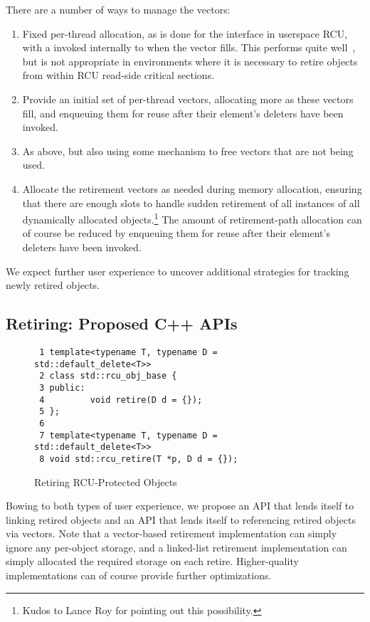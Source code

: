\documentclass[letterpaper,10pt]{article}
\begin{document}
There are a number of ways to manage the vectors:

\begin{enumerate}
\item	Fixed per-thread allocation, as is done for the 
	interface in userspace RCU, with a 
	invoked internally to  when the vector fills.
	This performs quite well~\cite{MathieuDesnoyers2012URCU}, but
	is not appropriate in environments where it is necessary to
	retire objects from within RCU read-side critical sections.
\item	Provide an initial set of per-thread vectors, allocating more
	as these vectors fill, and enqueuing them for reuse after
	their element's deleters have been invoked.
\item	As above, but also using some mechanism to free vectors that
	are not being used.
\item	Allocate the retirement vectors as needed during memory allocation,
	ensuring that there are enough slots to handle sudden
	retirement of all instances of all dynamically allocated
	objects.\footnote{
		Kudos to Lance Roy for pointing out this possibility.}
	The amount of retirement-path allocation can of course be reduced
	by enqueuing them for reuse after their element's deleters have
	been invoked.
\end{enumerate}

We expect further user experience to uncover additional strategies for
tracking newly retired objects.

\subsection{Retiring: Proposed C++ APIs}
\label{sec:Retiring: Proposed C++ APIs}

\begin{figure}[tbp]
{ \scriptsize
\begin{verbatim}
 1 template<typename T, typename D = std::default_delete<T>>
 2 class std::rcu_obj_base {
 3 public:
 4         void retire(D d = {});
 5 };
 6
 7 template<typename T, typename D = std::default_delete<T>>
 8 void std::rcu_retire(T *p, D d = {});
\end{verbatim}
}
\caption{Retiring RCU-Protected Objects}
\label{fig:Retiring RCU-Protected Objects}
\end{figure}

Bowing to both types of user experience, we propose an API that
lends itself to linking retired objects and an API that lends
itself to referencing retired objects via vectors.
Note that a vector-based retirement implementation can simply ignore
any per-object storage, and a linked-list retirement implementation
can simply allocated the required storage on each retire.
Higher-quality implementations can of course provide further optimizations.
\end{document}
